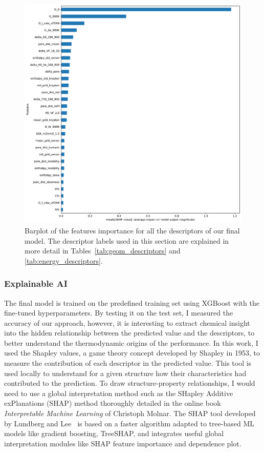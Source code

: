 \documentclass[main]{subfiles}
\begin{document}
\begin{figure}[ht]
  \centering
    \includegraphics[width=0.70\linewidth]{figures/4-ml/SI_figure/Feature_importance_shapbased.pdf}
    \caption{Barplot of the features importance for all the descriptors of our final model. The descriptor labels used in this section are explained in more detail in Tables~\ref{tab:geom_descriptors} and \ref{tab:energy_descriptors}.}\label{fgr:featimp_shap}
  \end{figure}

\subsubsection{Explainable AI}

The final model is trained on the predefined training set using XGBoost with the fine-tuned hyperparameters. By testing it on the test set, I measured the accuracy of our approach, however, it is interesting to extract chemical insight into the hidden relationship between the predicted value and the descriptors, to better understand the thermodynamic origins of the performance. In this work, I used the Shapley values,\autocite{shapley1953value} a game theory concept developed by Shapley in 1953, to measure the contribution of each descriptor in the predicted value. This tool is used locally to understand for a given structure how their characteristics had contributed to the prediction. To draw structure-property relationships, I would need to use a global interpretation method such as the SHapley Additive exPlanations (SHAP) method thoroughly detailed in the online book \emph{Interpretable Machine Learning} of Christoph Molnar.\autocite{molnar2020interpretable} The SHAP tool developed by Lundberg and Lee~\autocite{SHAP} is based on a faster algorithm adapted to tree-based ML models like gradient boosting, TreeSHAP, and integrates useful global interpretation modules like SHAP feature importance and dependence plot.
\end{document}
